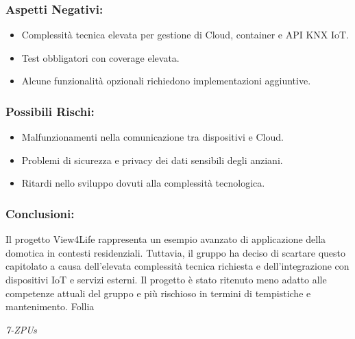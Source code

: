 \documentclass[a4paper,12pt]{article}
\begin{document}
\subsubsection*{Aspetti Negativi:}
\begin{itemize}
    \item Complessità tecnica elevata per gestione di Cloud, container e API KNX IoT.
    \item Test obbligatori con coverage elevata.
    \item Alcune funzionalità opzionali richiedono implementazioni aggiuntive.
\end{itemize}

\subsubsection*{Possibili Rischi:}
\begin{itemize}
    \item Malfunzionamenti nella comunicazione tra dispositivi e Cloud.
    \item Problemi di sicurezza e privacy dei dati sensibili degli anziani.
    \item Ritardi nello sviluppo dovuti alla complessità tecnologica.
\end{itemize}

\subsubsection*{Conclusioni:}
Il progetto View4Life rappresenta un esempio avanzato di applicazione della domotica in contesti residenziali. Tuttavia, il gruppo ha deciso di scartare questo capitolato a causa dell'elevata complessità tecnica richiesta e dell'integrazione con dispositivi IoT e servizi esterni. Il progetto è stato ritenuto meno adatto alle competenze attuali del gruppo e più rischioso in termini di tempistiche e mantenimento.
Follia
\vspace{0.5cm}

\vfill
\begin{flushright}
    \textit{7-ZPUs}
\end{flushright}
\end{document}

